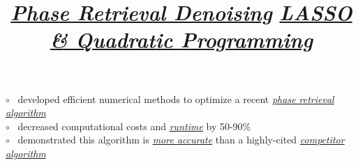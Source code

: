 \documentclass[12pt,margintitle,line]{res}
\begin{document}
\begin{resume}
\vspace{-0.5cm}
\title{
\href{https://github.com/Will-Wright/low-rank-opt-rapid-eig} {\textsl{Phase Retrieval Denoising}}
}
\employer{ 
}
\dates{}
\begin{position}
	
\vspace{-1.25cm}
$\circ$ \ developed efficient numerical methods to optimize a recent \href{https://arxiv.org/abs/1508.00315}{\textit{phase retrieval algorithm}}
	\\
$\circ$ \ decreased computational costs and 
\href{https://github.com/Will-Wright/low-rank-opt-rapid-eig#comparison-of-saga_sd-and-saga_sd-rapid-eig}{\textit{runtime}}
by 50-90\%
	\\
$\circ$ \ demonstrated this algorithm is 
\href{https://github.com/Will-Wright/low-rank-opt-rapid-eig#comparison-of-saga_sd-and-wflow-for-noisy-phase-retrieval}{\textit{more accurate}}
than a highly-cited \href{https://arxiv.org/abs/1407.1065}{\textit{competitor algorithm}}
\end{position}





\vspace{-0.5cm}
\title{
\href{https://github.com/Will-Wright/lasso-quadratic-solver} {\textsl{LASSO \& Quadratic Programming}}
}
\employer{ 
}
\dates{}
\begin{position}
	
	\begin{figure} 
		\vspace{-1.40cm}
		\hspace{-3.70cm}
 	 	\begin{minipage}[t]{3cm}
  		\end{minipage} 
	\end{figure} 	
	

\end{position}
\end{resume}
\end{document}
